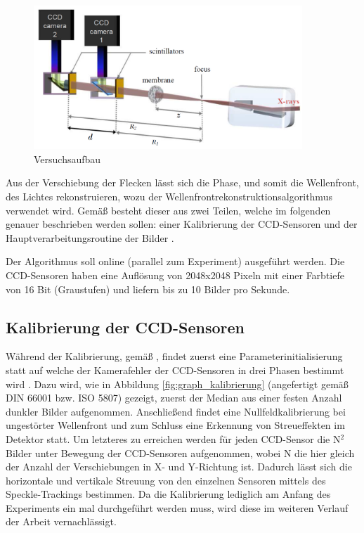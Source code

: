 \begin{figure}[htbp]
	\begin{center}
		\includegraphics[width=0.9\textwidth]{img/Versuchsaufbau}
		\caption[Versuchsaufbau]{Versuchsaufbau }
		\label{fig:versuch}
	\end{center}
\end{figure}

Aus der Verschiebung der Flecken lässt sich die Phase, und somit die Wellenfront, des Lichtes rekonstruieren, wozu der Wellenfrontrekonstruktionsalgorithmus verwendet wird. Gemäß \citeauthor{Ber13} besteht dieser aus zwei Teilen, welche im folgenden genauer beschrieben werden sollen: einer Kalibrierung der \gls{CCD}-Sensoren und der Hauptverarbeitungsroutine der Bilder . 

Der Algorithmus soll online (parallel zum Experiment) ausgeführt werden. Die \gls{CCD}-Sensoren haben eine Auflösung von 2048x2048 Pixeln mit einer Farbtiefe von 16 Bit (Graustufen) und liefern bis zu 10 Bilder pro Sekunde.

\subsection{Kalibrierung der CCD-Sensoren}

Während der Kalibrierung, gemäß \citeauthor{Ber13}, findet zuerst eine Parameterinitialisierung statt auf welche der Kamerafehler der \gls{CCD}-Sensoren in drei Phasen bestimmt wird . Dazu wird, wie in Abbildung \ref{fig:graph_kalibrierung} (angefertigt gemäß DIN 66001 bzw. ISO 5807) gezeigt, zuerst der Median aus einer festen Anzahl dunkler Bilder aufgenommen. Anschließend findet eine Nullfeldkalibrierung bei ungestörter Wellenfront und zum Schluss eine Erkennung von Streueffekten im Detektor statt. Um letzteres zu erreichen werden für jeden \gls{CCD}-Sensor die \gls{N}$^2$ Bilder unter Bewegung der \gls{CCD}-Sensoren aufgenommen, wobei \gls{N} die hier gleich der Anzahl der Verschiebungen in X- und Y-Richtung ist. Dadurch lässt sich die horizontale und vertikale Streuung von den einzelnen Sensoren mittels des Speckle-Trackings bestimmen. Da die Kalibrierung lediglich am Anfang des Experiments ein mal durchgeführt werden muss, wird diese im weiteren Verlauf der Arbeit vernachlässigt. 

